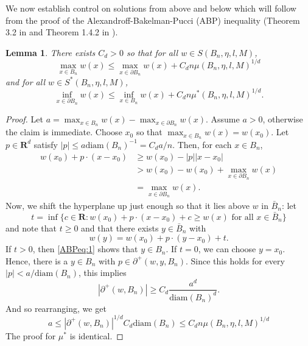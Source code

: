 \documentclass[12pt]{amsart}
\newcommand{\R}{\mathbf{R}}
\newcommand{\diam}{{\mbox{diam}}}  %
\newtheorem{lemma}[theorem]{Lemma}
\begin{document}
We now establish control on solutions from above and below which will follow from the proof of the Alexandroff-Bakelman-Pucci (ABP) inequality (Theorem 3.2 in \cite{roberts1995fully} and Theorem 1.4.2 in \cite{gutierrez2016monge}). 
\begin{lemma} \label{ABP}
There exists $C_d > 0$ so that for all  $w \in  S(B_n, \eta, l , M)$, 
\begin{equation}
\max_{x \in  B_n} w(x) \leq  \max_{x \in \partial B_n} w(x) + C_d n \mu(B_n, \eta, l ,M)^{1/d}
\end{equation}
and for all  $w \in  S^*(B_n, \eta, l , M)$, 
\begin{equation}
\inf_{x \in  \partial B_n} w(x) \leq  \inf_{x \in B_n} w(x) + C_d n \mu^*(B_n, \eta, l ,M)^{1/d}.
\end{equation}
\end{lemma}
\begin{proof}
Let $a = \max_{x \in B_n} w(x) - \max_{x \in \partial B_n} w(x)$. Assume $a > 0$, otherwise the claim is immediate. 
Choose $x_0$ so that $\max_{x \in  B_n} w(x) = w(x_0)$. Let $p \in \R^d$  satisfy $|p| \leq a \mbox{diam}(B_n)^{-1} = C_d a/n$. Then, 
for each $x \in B_n$, 
\begin{equation}\label{ABPeq:1}
\begin{aligned}
w(x_0) + p \cdot (x-x_0) &\geq w(x_0) - |p| |x-x_0| \\
&> w(x_0) - w(x_0) + \max_{x \in \partial B_n} w(x)  \\
&= \max_{x \in \partial B_n} w(x).
\end{aligned}
\end{equation}
Now, we shift the hyperplane up just enough so that it lies above $w$ in $\bar{B}_n$: let 
\[
t = \inf\{ c  \in \R:  w(x_0) + p \cdot(x-x_0)  + c \geq w(x) \mbox{ for all $x \in \bar{B}_n$} \}
\]
and note that $t \geq 0$ and that there exists $y \in \bar{B}_n$ with 
\[
w(y) = w(x_0) + p \cdot(y-x_0)  + t. 
\]
If $t > 0$, then \eqref{ABPeq:1} shows that $y \in B_n$.   If $t = 0$, we can choose $y = x_0$. Hence, there is a $y \in B_n$ with $p \in \partial^+(w, y , B_n)$. Since this holds for every $|p|  < a/\mbox{diam}(B_n)$, 
this implies
\[
|\partial^+(w, B_n)| \geq C_d \frac{a^d}{ {\diam}(B_n)^d}.
\]
And so rearranging, we get 
\[
a \leq |\partial^+(w, B_n)|^{1/d} C_d \diam(B_n) \leq C_d n \mu(B_n, \eta, l, M)^{1/d} 
\]
The proof for $\mu^*$ is identical. 


\end{proof}
\end{document}
